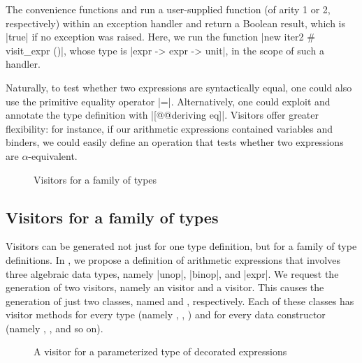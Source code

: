\documentclass[11pt,a4paper,twoside]{article}
\begin{document}
The convenience functions  and
 run a user-supplied function (of arity 1 or 2,
respectively) within an exception handler and return a Boolean result, which
is \oc|true| if no exception was raised. Here, we run the function
%
\oc|new iter2 # visit_expr ()|, whose type is \oc|expr -> expr -> unit|,
in the scope of such a handler.

Naturally, to test whether two expressions are syntactically equal, one could
also use the primitive equality operator \oc|=|. Alternatively, one could
exploit \ppxderiving and annotate the type definition with
%
\oc|[@@deriving eq]|. Visitors offer greater flexibility: for instance, if our
arithmetic expressions contained variables and binders, we could easily define
an operation that tests whether two expressions are $\alpha$-equivalent.


\begin{figure}[p]
\caption{Visitors for a family of types}
\label{fig:expr06}
\end{figure}

\subsection{Visitors for a family of types}
\label{sec:intro:family}

Visitors can be generated not just for one type definition, but for a family
of type definitions. In , we propose a definition of
arithmetic expressions that involves three algebraic data types, namely
\oc|unop|, \oc|binop|, and \oc|expr|. We request the generation of two
visitors, namely an \iter visitor and a \map visitor. This causes the
generation of just two classes, named \iter and \map, respectively. Each of
these classes has visitor methods for every type (namely ,
, ) and for every data constructor
(namely , , and so on).


\begin{figure}[p]
\vspace{-\baselineskip}
\caption{A visitor for a parameterized type of decorated expressions}
\label{fig:expr09}
\end{figure}
\end{document}
